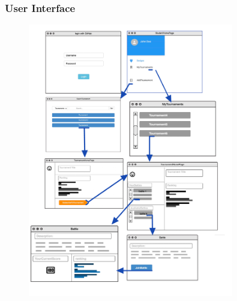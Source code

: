 \subsubsection{User Interface}
\begin{figure}[h]
  \centering
  \includegraphics[width=0.8\textwidth]{RASD/3Specific_Requirements/res/mockup.jpg}
\end{figure}

